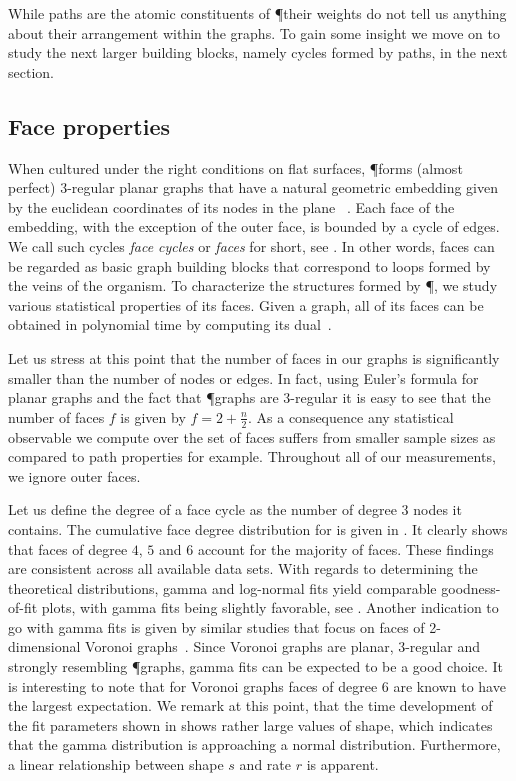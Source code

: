 		While paths are the atomic constituents of \P their weights do not tell us anything about their arrangement within the graphs. To gain some insight we move on to study the next larger building blocks, namely cycles formed by paths, in the next section.

	\subsection{Face properties}

		When cultured under the right conditions on flat surfaces, \P forms (almost perfect) $3$-regular planar graphs that have a natural geometric embedding given by the euclidean coordinates of its nodes in the plane ~\cite{baumgarten2010plasmodial}. Each face of the embedding, with the exception of the outer face, is bounded by a cycle of edges. We call such cycles \emph{face cycles} or \emph{faces} for short, see . In other words, faces can be regarded as basic graph building blocks that correspond to loops formed by the veins of the organism. To characterize the structures formed by \P, we study various statistical properties of its faces. Given a graph, all of its faces can be obtained in polynomial time by computing its dual~\cite{mehlhorn1995leda}. 

		Let us stress at this point that the number of faces in our graphs is significantly smaller than the number of nodes or edges. In fact, using Euler's formula for planar graphs and the fact that \P graphs are $3$-regular it is easy to see that the number of faces $f$ is given by $f = 2 + \frac{n}{2}$. As a consequence any statistical observable we compute over the set of faces suffers from smaller sample sizes as compared to path properties for example. Throughout all of our measurements, we ignore outer faces.

		Let us define the degree of a face cycle as the number of degree $3$ nodes it contains.	The cumulative face degree distribution for  is given in . It clearly shows that faces of degree $4$, $5$ and $6$ account for the majority of faces. These findings are consistent across all available data sets. With regards to determining the theoretical distributions, gamma and log-normal fits yield comparable goodness-of-fit plots, with gamma fits being slightly favorable, see . Another indication to go with gamma fits is given by similar studies that focus on faces of 2-dimensional Voronoi graphs~\cite{hinde1980monte,tanemura2003statistical}. Since Voronoi graphs are planar, $3$-regular and strongly resembling \P graphs, gamma fits can be expected to be a good choice. It is interesting to note that for Voronoi graphs faces of degree $6$ are known to have the largest expectation. We remark at this point, that the time development of the fit parameters shown in  shows rather large values of shape, which indicates that the gamma distribution is approaching a normal distribution. Furthermore, a linear relationship between shape $s$ and rate $r$ is apparent.
 
